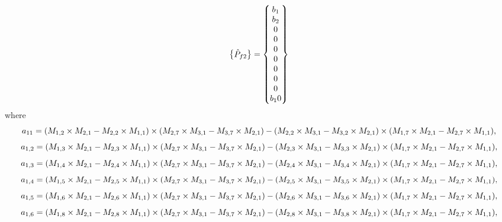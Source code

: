 \documentclass[10pt]{asme2ej}
\begin{document}
\begin{landscape}
\[\begin{Bmatrix}
    \Hat{P}_{f2}
\end{Bmatrix}
=
\begin{Bmatrix}
    b_1\\
    b_2\\
    0\\
    0\\
    0\\
    0\\
    0\\
    0\\
    0\\
    b_10
\end{Bmatrix}
\]
\tiny
where
\begin{equation}
    a_{11} = (M_{1,2}\times M_{2,1}-M_{2,2}\times M_{1,1})\times (M_{2,7}\times M_{3,1}-M_{3,7}\times M_{2,1})\\-(M_{2,2}\times M_{3,1}-M_{3,2}\times M_{2,1})\times (M_{1,7}\times M_{2,1}-M_{2,7}\times M_{1,1}),
\end{equation}
\begin{equation}
    a_{1,2} = (M_{1,3}\times M_{2,1}-M_{2,3}\times M_{1,1})\times (M_{2,7}\times M_{3,1}-M_{3,7}\times M_{2,1})\\-(M_{2,3}\times M_{3,1}-M_{3,3}\times M_{2,1})\times (M_{1,7}\times M_{2,1}-M_{2,7}\times M_{1,1}),
\end{equation}
\begin{equation}
    a_{1,3} = (M_{1,4}\times M_{2,1}-M_{2,4}\times M_{1,1})\times (M_{2,7}\times M_{3,1}-M_{3,7}\times M_{2,1})\\-(M_{2,4}\times M_{3,1}-M_{3,4}\times M_{2,1})\times (M_{1,7}\times M_{2,1}-M_{2,7}\times M_{1,1}), 
\end{equation}
\begin{equation}
    a_{1,4} = (M_{1,5}\times M_{2,1}-M_{2,5}\times M_{1,1})\times (M_{2,7}\times M_{3,1}-M_{3,7}\times M_{2,1})\\-(M_{2,5}\times M_{3,1}-M_{3,5}\times M_{2,1})\times (M_{1,7}\times M_{2,1}-M_{2,7}\times M_{1,1}), 
\end{equation}
\begin{equation}
    a_{1,5} = (M_{1,6}\times M_{2,1}-M_{2,6}\times M_{1,1})\times (M_{2,7}\times M_{3,1}-M_{3,7}\times M_{2,1})\\-(M_{2,6}\times M_{3,1}-M_{3,6}\times M_{2,1})\times (M_{1,7}\times M_{2,1}-M_{2,7}\times M_{1,1}), 
\end{equation}
\begin{equation}
    a_{1,6} = (M_{1,8}\times M_{2,1}-M_{2,8}\times M_{1,1})\times (M_{2,7}\times M_{3,1}-M_{3,7}\times M_{2,1})\\-(M_{2,8}\times M_{3,1}-M_{3,8}\times M_{2,1})\times (M_{1,7}\times M_{2,1}-M_{2,7}\times M_{1,1}), 

\end{equation}
\end{landscape}
\end{document}
